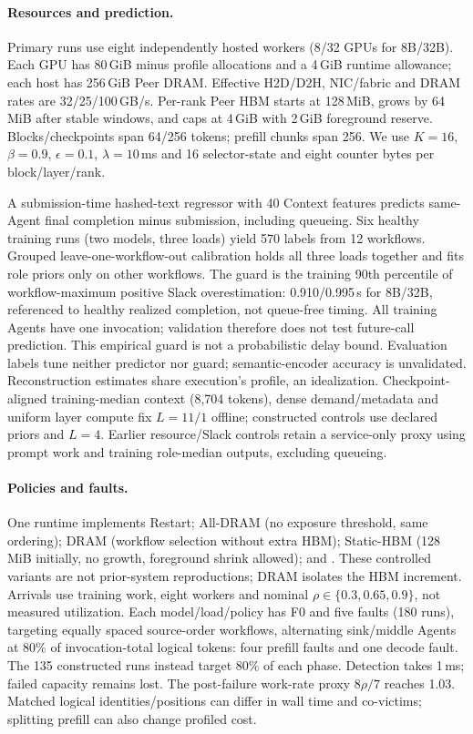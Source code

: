 \paragraph{Resources and prediction.}
Primary runs use eight independently hosted workers (8/32 GPUs for 8B/32B).
Each GPU has 80\,GiB minus profile allocations and a 4\,GiB runtime allowance;
each host has 256\,GiB Peer DRAM. Effective H2D/D2H, NIC/fabric and DRAM rates
are 32/25/100\,GB/s. Per-rank Peer HBM starts at 128\,MiB, grows by 64\,MiB
after stable windows, and caps at 4\,GiB with 2\,GiB foreground reserve.
Blocks/checkpoints span 64/256 tokens; prefill chunks span 256.
We use $K=16$, $\beta=0.9$, $\epsilon=0.1$, $\lambda=10$\,ms and
16 selector-state and eight counter bytes per block/layer/rank.

A submission-time hashed-text regressor with 40 Context features predicts
same-Agent final completion minus submission, including queueing. Six healthy
training runs (two models, three loads) yield 570 labels from 12 workflows.
Grouped leave-one-workflow-out calibration holds all three loads together and
fits role priors only on other workflows. The guard is the training 90th
percentile of workflow-maximum positive Slack overestimation: 0.910/0.995\,s
for 8B/32B, referenced to healthy realized completion, not queue-free timing.
All training Agents have one invocation; validation therefore does not test
future-call prediction. This empirical guard is not a probabilistic delay bound.
Evaluation labels tune neither predictor nor guard; semantic-encoder accuracy
is unvalidated. Reconstruction estimates share execution's profile, an idealization.
Checkpoint-aligned training-median context (8,704 tokens), dense demand/metadata and uniform
layer compute fix $L=11/1$ offline; constructed controls use declared priors
and $L=4$. Earlier resource/Slack controls retain a service-only proxy using
prompt work and training role-median outputs, excluding queueing.

\paragraph{Policies and faults.}
One runtime implements Restart; All-DRAM (no exposure threshold, same ordering);
DRAM (workflow selection without extra HBM); Static-HBM (128\,MiB initially,
no growth, foreground shrink allowed); and \system. These controlled variants
are not prior-system reproductions; DRAM isolates the HBM increment.
Arrivals use training work, eight workers and nominal
$\rho\in\{0.3,0.65,0.9\}$, not measured utilization.
Each model/load/policy has F0 and five faults (180 runs), targeting equally
spaced source-order workflows, alternating sink/middle Agents at 80\% of
invocation-total logical tokens: four prefill faults and one decode fault.
The 135 constructed runs instead target 80\% of each phase.
Detection takes 1\,ms; failed capacity remains lost. The post-failure work-rate
proxy $8\rho/7$ reaches 1.03. Matched logical identities/positions can differ
in wall time and co-victims; splitting prefill can also change profiled cost.

